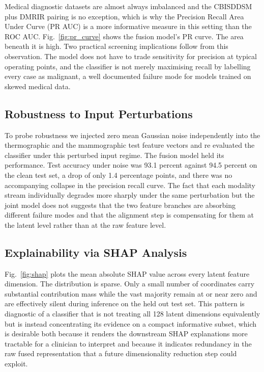 \documentclass[lettersize,journal]{IEEEtran}
\begin{document}
Medical diagnostic datasets are almost always imbalanced and the CBIS\textendash DDSM plus DMR\textendash IR pairing is no exception, which is why the Precision Recall Area Under Curve (PR AUC) is a more informative measure in this setting than the ROC AUC. Fig.~\ref{fig:pr_curve} shows the fusion model's PR curve. The area beneath it is high. Two practical screening implications follow from this observation. The model does not have to trade sensitivity for precision at typical operating points, and the classifier is not merely maximising recall by labelling every case as malignant, a well documented failure mode for models trained on skewed medical data.

\subsection{Robustness to Input Perturbations}
To probe robustness we injected zero mean Gaussian noise independently into the thermographic and the mammographic test feature vectors and re evaluated the classifier under this perturbed input regime. The fusion model held its performance. Test accuracy under noise was 93.1 percent against 94.5 percent on the clean test set, a drop of only 1.4 percentage points, and there was no accompanying collapse in the precision recall curve. The fact that each modality stream individually degrades more sharply under the same perturbation but the joint model does not suggests that the two feature branches are absorbing different failure modes and that the alignment step is compensating for them at the latent level rather than at the raw feature level.


\subsection{Explainability via SHAP Analysis}



Fig.~\ref{fig:shap} plots the mean absolute SHAP value across every latent feature dimension. The distribution is sparse. Only a small number of coordinates carry substantial contribution mass while the vast majority remain at or near zero and are effectively silent during inference on the held out test set. This pattern is diagnostic of a classifier that is not treating all 128 latent dimensions equivalently but is instead concentrating its evidence on a compact informative subset, which is desirable both because it renders the downstream SHAP explanations more tractable for a clinician to interpret and because it indicates redundancy in the raw fused representation that a future dimensionality reduction step could exploit.
\end{document}
